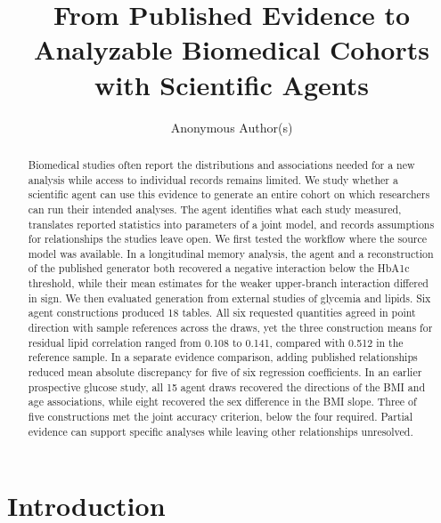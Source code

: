 \documentclass[sigconf,anonymous,review]{acmart}
\begin{document}
\title{From Published Evidence to Analyzable Biomedical Cohorts with Scientific Agents}
\author{Anonymous Author(s)}
\begin{abstract}

Biomedical studies often report the distributions and associations needed for a new analysis while access to individual records remains limited. We study whether a scientific agent can use this evidence to generate an entire cohort on which researchers can run their intended analyses. The agent identifies what each study measured, translates reported statistics into parameters of a joint model, and records assumptions for relationships the studies leave open. We first tested the workflow where the source model was available. In a longitudinal memory analysis, the agent and a reconstruction of the published generator both recovered a negative interaction below the HbA1c threshold, while their mean estimates for the weaker upper-branch interaction differed in sign. We then evaluated generation from external studies of glycemia and lipids. Six agent constructions produced 18 tables. All six requested quantities agreed in point direction with sample references across the draws, yet the three construction means for residual lipid correlation ranged from 0.108 to 0.141, compared with 0.512 in the reference sample. In a separate evidence comparison, adding published relationships reduced mean absolute discrepancy for five of six regression coefficients. In an earlier prospective glucose study, all 15 agent draws recovered the directions of the BMI and age associations, while eight recovered the sex difference in the BMI slope. Three of five constructions met the joint accuracy criterion, below the four required. Partial evidence can support specific analyses while leaving other relationships unresolved.

\end{abstract}

\maketitle

\section{Introduction}
\end{document}
